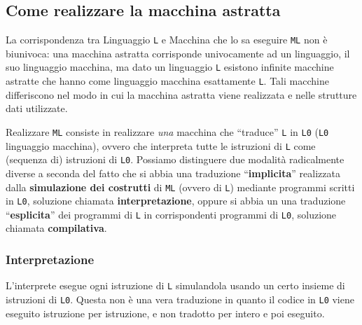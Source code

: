 \documentclass[12pt,a4paper]{article}
\begin{document}
\begin{figure}[h!]
	\begin{center}
	\end{center}
\end{figure}

\clearpage

\subsection{Come realizzare la macchina astratta}
La corrispondenza tra Linguaggio \texttt{L} e Macchina che lo sa eseguire \texttt{ML} non è biunivoca: una macchina astratta corrisponde univocamente ad un linguaggio, il suo linguaggio macchina, ma dato un linguaggio \texttt{L} esistono infinite macchine astratte che hanno
come linguaggio macchina esattamente \texttt{L}. Tali macchine differiscono nel modo in cui la macchina astratta viene realizzata e nelle strutture dati utilizzate.

Realizzare \texttt{ML} consiste in realizzare \textit{una} macchina che ``traduce'' \texttt{L} in \texttt{L0} (\texttt{L0} linguaggio macchina), ovvero che interpreta tutte le istruzioni di \texttt{L} come (sequenza di) istruzioni di \texttt{L0}. Possiamo distinguere due modalità radicalmente diverse a seconda del fatto che si abbia una traduzione ``\textbf{implicita}'' realizzata dalla \textbf{simulazione dei costrutti} di \texttt{ML} (ovvero di \texttt{L}) mediante programmi scritti in \texttt{L0}, soluzione chiamata \textbf{interpretazione}, oppure si abbia un una traduzione ``\textbf{esplicita}'' dei programmi di \texttt{L} in corrispondenti programmi di \texttt{L0}, soluzione chiamata \textbf{compilativa}.

\subsubsection{Interpretazione}
L'interprete esegue ogni istruzione di \texttt{L} simulandola usando un certo insieme di istruzioni di \texttt{L0}. Questa non è una vera traduzione in quanto il codice in \texttt{L0} viene eseguito istruzione per istruzione, e non tradotto per intero e poi eseguito.
\end{document}

